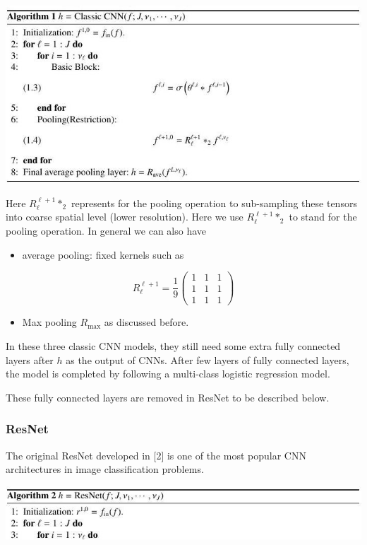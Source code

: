 \documentclass[10pt]{article}
\begin{document}
\includegraphics[max width=\textwidth]{2022_01_06_73aade67e8906ae5893fg-4}

Here $R_{\ell}^{\ell+1} *_{2}$ represents for the pooling operation to sub-sampling these tensors into coarse spatial level (lower resolution). Here we use $R_{\ell}^{\ell+1} *_{2}$ to stand for the pooling operation. In general we can also have

    \begin{itemize}
      \item average pooling: fixed kernels such as
    \end{itemize}
$$
R_{\ell}^{\ell+1}=\frac{1}{9}\left(\begin{array}{lll}
1 & 1 & 1 \\
1 & 1 & 1 \\
1 & 1 & 1
\end{array}\right)
$$

    \begin{itemize}
      \item Max pooling $R_{\max }$ as discussed before.
    \end{itemize}
In these three classic CNN models, they still need some extra fully connected layers after $h$ as the output of CNNs. After few layers of fully connected layers, the model is completed by following a multi-class logistic regression model.

These fully connected layers are removed in ResNet to be described below.

\subsubsection{ResNet}
The original ResNet developed in [2] is one of the most popular CNN architectures in image classification problems.

\includegraphics[max width=\textwidth]{2022_01_06_73aade67e8906ae5893fg-4(1)}
\end{document}
